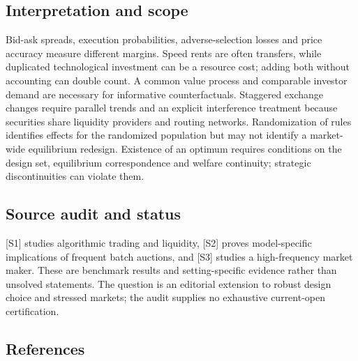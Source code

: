 \documentclass[11pt,a4paper]{article}
\begin{document}
\subsection*{Interpretation and scope}
Bid-ask spreads, execution probabilities, adverse-selection losses and price accuracy measure different margins. Speed rents are often transfers, while duplicated technological investment can be a resource cost; adding both without accounting can double count. A common value process and comparable investor demand are necessary for informative counterfactuals. Staggered exchange changes require parallel trends and an explicit interference treatment because securities share liquidity providers and routing networks. Randomization of rules identifies effects for the randomized population but may not identify a market-wide equilibrium redesign. Existence of an optimum requires conditions on the design set, equilibrium correspondence and welfare continuity; strategic discontinuities can violate them.

\subsection*{Source audit and status}
[S1] studies algorithmic trading and liquidity, [S2] proves model-specific implications of frequent batch auctions, and [S3] studies a high-frequency market maker. These are benchmark results and setting-specific evidence rather than unsolved statements. The question is an editorial extension to robust design choice and stressed markets; the audit supplies no exhaustive current-open certification.

\subsection*{References}
\end{document}
